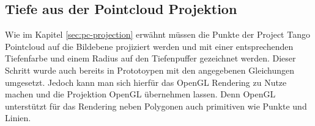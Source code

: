 \subsection{Tiefe aus der Pointcloud Projektion}

Wie im Kapitel \ref{sec:pc-projection} erwähnt müssen die Punkte der Project Tango Pointcloud auf die Bildebene projiziert werden und mit einer entsprechenden Tiefenfarbe und einem Radius auf den Tiefenpuffer gezeichnet werden. Dieser Schritt wurde auch bereits in Prototoypen mit den angegebenen Gleichungen umgesetzt. Jedoch kann man sich hierfür das OpenGL Rendering zu Nutze machen und die Projektion OpenGL übernehmen lassen. Denn OpenGL unterstützt für das Rendering neben Polygonen auch primitiven wie Punkte und Linien. 


